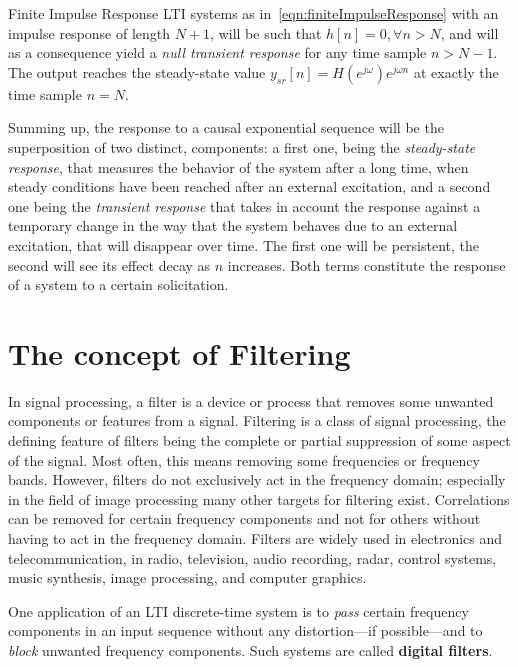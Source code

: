 \documentclass[\documentfontsize, twocolumn]{\classname}
\begin{document}
Finite Impulse Response LTI systems as in~\ref{eqn:finiteImpulseResponse} with an impulse response of length $N+1$, will be such that $h[n] = 0, \forall n > N$, and will as a consequence yield a \emph{null transient response} for any time sample $n > N - 1$. The output reaches the steady-state value $y_{sr}[n] = H(e^{j\omega})e^{j\omega n}$ at exactly the time sample $n = N$.

Summing up, the response to a causal exponential sequence will be the superposition of two distinct, components: a first one, being the \emph{steady-state response}, that measures the behavior of the system after a long time, when steady conditions have been reached after an external excitation, and a second one being the \emph{transient response} that takes in account the response against a temporary change in the way that the system behaves due to an external excitation, that will disappear over time. The first one will be persistent, the second will see its effect decay as $n$ increases. Both terms constitute the response of a system to a certain solicitation.

\section{The concept of Filtering}

In signal processing, a filter is a device or process that removes some unwanted components or features from a signal. Filtering is a class of signal processing, the defining feature of filters being the complete or partial suppression of some aspect of the signal. Most often, this means removing some frequencies or frequency bands. However, filters do not exclusively act in the frequency domain; especially in the field of image processing many other targets for filtering exist. Correlations can be removed for certain frequency components and not for others without having to act in the frequency domain. Filters are widely used in electronics and telecommunication, in radio, television, audio recording, radar, control systems, music synthesis, image processing, and computer graphics\cite{bib:filtering}.

One application of an LTI discrete-time system is to \emph{pass} certain frequency components in an input sequence without any distortion---if possible---and to \emph{block} unwanted frequency components. Such systems are called \textbf{digital filters}.
\end{document}
